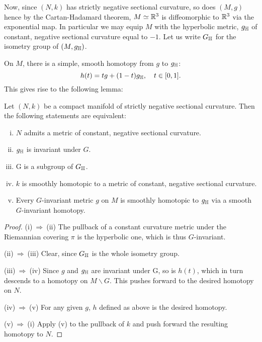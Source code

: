 \documentclass[a4paper,12pt]{amsart}
\begin{document}

Now, since \((N, k)\) has strictly negative sectional curvature, so does \((M, g)\) hence by the Cartan-Hadamard theorem, \(M \simeq \mathbb{R}^3\) is diffeomorphic to \(\mathbb{R}^3\) via the exponential map. In particular we may equip \(M\) with the hyperbolic metric, \(g_{\mathbb{H}}\) of constant, negative sectional curvature equal to \(-1\). Let us write \(G_{\mathbb{H}}\) for the isometry group of \((M, g_{\mathbb{H}})\).

On \(M\), there is a simple, smooth homotopy from \(g\) to \(g_{\mathbb{H}}\):
\[
h(t) = tg + (1-t)g_{\mathbb{H}}, \quad t \in [0, 1].
\]
This gives rise to the following lemma:

\begin{lemma}
\label{lem:const_neg}

Let \((N, k)\) be a compact manifold of strictly negative sectional curvature. Then the following statements are equivalent:
\begin{enumerate}[(i)]
\item \label{enum:neg_met} \(N\) admits a metric of constant, negative sectional curvature.
\item \label{enum:deck_met} \(g_{\mathbb{H}}\) is invariant under \(G\).
\item \label{enum:subgroup} G is a subgroup of \(G_{\mathbb{H}}\).
\item \label{enum:homo_met} \(k\) is smoothly homotopic to a metric of constant, negative sectional curvature.
\item \label{enum:homo_deck} Every \(G\)-invariant metric \(g\) on \(M\) is smoothly homotopic to \(g_{\mathbb{H}}\) via a smooth \(G\)-invariant homotopy.
\end{enumerate}
\end{lemma}

\begin{proof}
(i)\(\ \Rightarrow\ \)(ii) 
The pullback of a constant curvature metric under the Riemannian covering $\pi$ is the hyperbolic one, which is thus \(G\)-invariant.

(ii)\(\ \Rightarrow\ \)(iii)
Clear, since \(G_{\mathbb{H}}\) is the whole isometry group.

(iii)\(\ \Rightarrow\ \)(iv)
Since \(g\) and \(g_{\mathbb{H}}\) are invariant under G, so is \(h(t)\), which in turn descends to a homotopy on \(M\backslash G\). This pushes forward to the desired homotopy on \(N\).

(iv)\(\ \Rightarrow\ \)(v)
For any given \(g\), \(h\) defined as above is the desired homotopy.

(v)\(\ \Rightarrow\ \)(i)
Apply (v) to the pullback of \(k\) and push forward the resulting homotopy to \(N\).
\end{proof}
\end{document}
